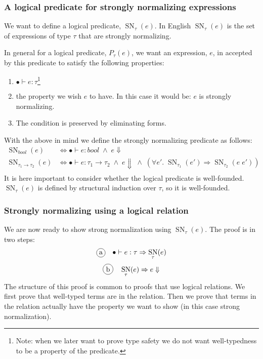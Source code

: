 \documentclass[a4paper,10pt,fleqn]{article}
\DeclareMathOperator{\SNPred}{SN}
\newcommand{\mtenv}{\ensuremath{\bullet}}
\newcommand{\tarrow}[2]{\ensuremath{ #1 \rightarrow #2}}
\newcommand{\SN}[2]{\ensuremath{\SNPred_{#1}(#2)}}
\newcommand*{\circled}[1]{\tikz[baseline=(char.base)]{
            \node[shape=circle,draw,inner sep=2pt] (char) {#1};}}
\begin{document}
\subsubsection*{A logical predicate for strongly normalizing expressions}
We want to define a logical predicate, \SN{\tau}{e}. In English $\SN{\tau}{e}$ is the set of expressions of type $\tau$ that are strongly normalizing.

In general for a logical predicate, $P_\tau(e)$, we want an expression, $e$, in accepted by this predicate to satisfy the following properties:
\begin{enumerate}
\item $\mtenv \vdash e : \tau$\footnote{Note: when we later want to prove type safety we do not want well-typedness to be a property of the predicate.}
\item the property we wish $e$ to have. In this case it would be: $e$ is strongly normalizing.
\item The condition is preserved by eliminating forms.
\end{enumerate}

With the above in mind we define the strongly normalizing predicate as follows:
\begin{align*}
  \SN{bool}{e} & \Leftrightarrow \mtenv \vdash e : bool \; \wedge \; e \Downarrow \\
  \SN{\tarrow{\tau_1}{\tau_2}}{e} & \Leftrightarrow \mtenv \vdash e : \tarrow{\tau_1}{\tau_2} \; \wedge \; e \Downarrow \; \wedge \; (\forall e'. \; \SN{\tau_1}{e'} \Rightarrow \SN{\tau_2}{e \; e'})\\
\end{align*}
It is here important to consider whether the logical predicate is well-founded. \SN{\tau}{e} is defined by structural induction %
over $\tau$, so it is well-founded.
\subsubsection*{Strongly normalizing using a logical relation}
We are now ready to show strong normalization using \SN{\tau}{e}. The proof is in two steps:
\[
\circled{a} \quad \mtenv \vdash e : \tau \Rightarrow \SN{\tau}{e}
\]
\[
\circled{b} \quad \SN{\tau}{e} \Rightarrow e \Downarrow
\]
The structure of this proof is common to proofs that use logical relations. We first prove that well-typed terms are in the relation. Then we prove that terms in the relation actually have the property we want to show (in this case strong normalization).
\end{document}
